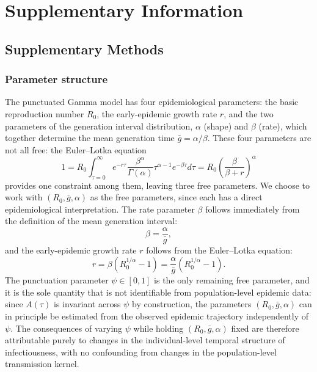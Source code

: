 \appendix
\setcounter{equation}{0}
\setcounter{figure}{0}
\setcounter{table}{0}
\renewcommand{\theequation}{S\arabic{equation}}
\renewcommand{\thefigure}{S\arabic{figure}}
\renewcommand{\thetable}{S\arabic{table}}

\section*{Supplementary Information}

\subsection*{Supplementary Methods}

\subsubsection*{Parameter structure}

The punctuated Gamma model has four epidemiological parameters: the basic  reproduction number $R_0$, the early-epidemic growth rate $r$, and the two  parameters of the generation interval distribution, $\alpha$ (shape) and  $\beta$ (rate), which together determine the mean generation time  $\bar{g} = \alpha/\beta$. These four parameters are not all free: the  Euler--Lotka equation
%
\begin{equation}
	1  
	=R_0 \int_{\tau=0}^\infty e^{-r\tau } \frac{\beta^\alpha}{\Gamma(\alpha)} \tau^{\alpha-1} e^{-\beta \tau} d\tau
	= R_0 \left(\frac{\beta}{\beta + r}\right)^\alpha
	\label{eq:euler_lotka}
\end{equation}
%
provides one constraint among them, leaving three free parameters. We  choose to work with $(R_0, \bar{g}, \alpha)$ as the free parameters,  since each has a direct epidemiological interpretation. The rate parameter $\beta$ follows immediately from the  definition of the mean generation interval:
%
\begin{equation}
    \beta = \frac{\alpha}{\bar{g}},
\end{equation}
%
and the early-epidemic growth rate $r$ follows from the Euler--Lotka equation:
%
\begin{equation}
    r = \beta\left(R_0^{1/\alpha} - 1\right) 
      = \frac{\alpha}{\bar{g}}\left(R_0^{1/\alpha} - 1\right).
    \label{eq:r_from_params}
\end{equation}
%
The punctuation  parameter $\psi \in [0, 1]$ is the only remaining free parameter, and  it is the sole quantity that is not identifiable from population-level  epidemic data: since $A(\tau)$ is invariant across $\psi$ by  construction, the parameters $(R_0, \bar{g}, \alpha)$ can in principle  be estimated from the observed epidemic trajectory independently of  $\psi$. The consequences of varying $\psi$ while holding  $(R_0, \bar{g}, \alpha)$ fixed are therefore attributable purely to  changes in the individual-level temporal structure of infectiousness, with no confounding from changes in the population-level transmission  kernel.

